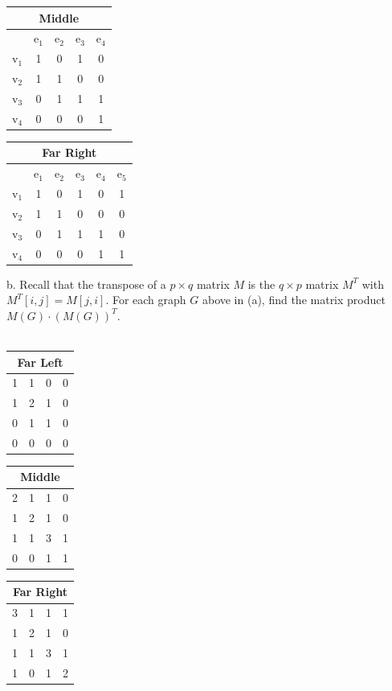\documentclass[12pt]{article}
\begin{document}
\begin{tabular}{|c|c|c|c|c|} 
\multicolumn{5}{c}{Middle}  \\ \hline
 & e$_1$ & e$_2$ & e$_3$ & e$_4$ \\ \hline
v$_1$ & 1 & 0 & 1 & 0 \\ \hline
v$_2$ & 1 & 1 & 0 & 0 \\ \hline
v$_3$ & 0 & 1 & 1 & 1 \\ \hline
v$_4$ & 0 & 0 & 0 & 1\\ \hline
\end{tabular}

\begin{tabular}{|c|c|c|c|c|c|} 
\multicolumn{6}{c}{Far Right}  \\ \hline
 & e$_1$ & e$_2$ & e$_3$ & e$_4$ & e$_5$\\ \hline
v$_1$ & 1 & 0 & 1 & 0 & 1 \\ \hline
v$_2$ & 1 & 1 & 0 & 0 & 0 \\ \hline
v$_3$ & 0 & 1 & 1 & 1 & 0 \\ \hline
v$_4$ & 0 & 0 & 0 & 1 & 1 \\ \hline
\end{tabular}

b. Recall that the transpose of a $ p \times q$ matrix $M$ is the $ q \times p $ matrix $M^{T}$ with $ M^{T}[i,j] = M[j,i]$. For each graph $G$ above in (a), find the matrix product $M(G) \cdot (M(G))^{T}$. \\ \\

\begin{tabular}{|c|c|c|c|} 
\multicolumn{4}{c}{Far Left}  \\ \hline
1 & 1 & 0 & 0 \\ \hline
1 & 2 & 1 & 0 \\ \hline
0 & 1 & 1 & 0 \\ \hline
0 & 0 & 0 & 0\\ \hline
\end{tabular}

\begin{tabular}{|c|c|c|c|} 
\multicolumn{4}{c}{Middle}  \\ \hline
2 & 1 & 1 & 0 \\ \hline
1 & 2 & 1 & 0 \\ \hline
1 & 1 & 3 & 1 \\ \hline
0 & 0 & 1 & 1\\ \hline
\end{tabular}

\begin{tabular}{|c|c|c|c|} 
\multicolumn{4}{c}{Far Right}  \\ \hline
3 & 1 & 1 & 1 \\ \hline
1 & 2 & 1 & 0 \\ \hline
1 & 1 & 3 & 1 \\ \hline
1 & 0 & 1 & 2\\ \hline
\end{tabular}




\end{document}
